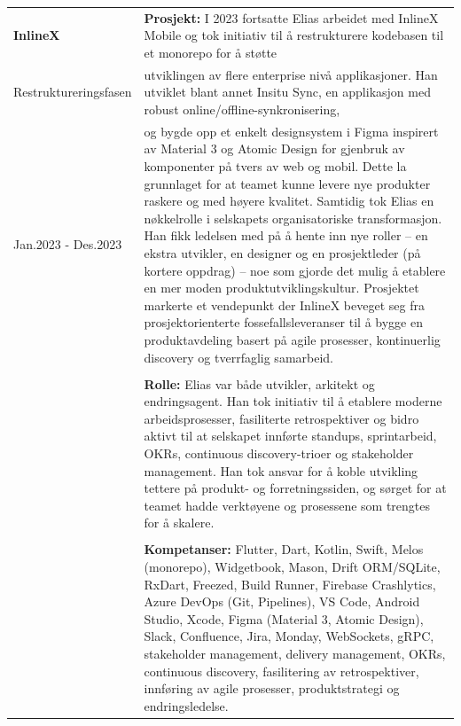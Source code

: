 \documentclass[a4paper,10pt]{article}
\begin{document}
\noindent
\begin{tabular}{@{}p{4cm}p{11cm}@{}}  %
\textbf{InlineX}
& \textbf{Prosjekt:} I 2023 fortsatte Elias arbeidet med InlineX Mobile og tok  initiativ til å restrukturere kodebasen til et monorepo for å støtte \\
Restruktureringsfasen & utviklingen av flere enterprise nivå applikasjoner. Han utviklet blant annet Insitu Sync,  en applikasjon med robust online/offline-synkronisering,\\
Jan.2023 - Des.2023 & og bygde opp et enkelt designsystem i Figma inspirert av Material 3 og Atomic Design for gjenbruk av komponenter på tvers av web og mobil. Dette la grunnlaget for at teamet kunne levere nye produkter raskere og med høyere kvalitet. Samtidig tok Elias en nøkkelrolle i selskapets organisatoriske transformasjon. Han fikk ledelsen med på å hente inn nye roller – en ekstra utvikler, en designer og en prosjektleder (på kortere oppdrag) – noe som gjorde det mulig å etablere en mer moden produktutviklingskultur. Prosjektet markerte et vendepunkt der InlineX beveget seg fra prosjektorienterte fossefallsleveranser til å bygge en produktavdeling basert på agile prosesser, kontinuerlig discovery og tverrfaglig samarbeid.\\
& \\
& \textbf{Rolle:} Elias var både utvikler, arkitekt og endringsagent. Han tok initiativ til å etablere moderne arbeidsprosesser, fasiliterte retrospektiver og bidro aktivt til at selskapet innførte standups, sprintarbeid, OKRs, continuous discovery-trioer og stakeholder management. Han tok ansvar for å koble utvikling tettere på produkt- og forretningssiden, og sørget for at teamet hadde verktøyene og prosessene som trengtes for å skalere. \\
& \\
& \textbf{Kompetanser:} Flutter, Dart, Kotlin, Swift, Melos (monorepo), Widgetbook, Mason, Drift ORM/SQLite, RxDart, Freezed, Build Runner, Firebase Crashlytics, Azure DevOps (Git, Pipelines), VS Code, Android Studio, Xcode, Figma (Material 3, Atomic Design), Slack, Confluence, Jira, Monday, WebSockets, gRPC, stakeholder management, delivery management, OKRs, continuous discovery, fasilitering av retrospektiver, innføring av agile prosesser, produktstrategi og endringsledelse. \\
\end{tabular}


\vspace{2em}
\end{document}
